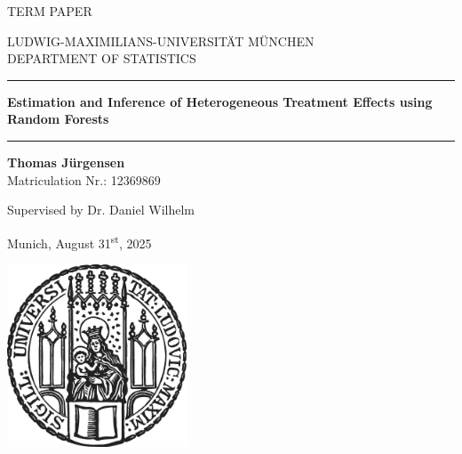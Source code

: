 \begin{titlepage}
\begin{center}

\Large
TERM PAPER

\vspace{0.5cm}
\Large
LUDWIG-MAXIMILIANS-UNIVERSITÄT MÜNCHEN\\
DEPARTMENT OF STATISTICS

\vspace{0.5cm}

\rule{\textwidth}{1.5pt}
\LARGE
\textbf{Estimation and Inference of Heterogeneous Treatment Effects using Random Forests}
\rule{\textwidth}{1.5pt}

\vspace{0.5cm}

\Large
\textbf{Thomas Jürgensen}\\
\large
Matriculation Nr.: 12369869

\vspace{0.5cm}

Supervised by Dr. Daniel Wilhelm

\vspace{0.5cm}

\large
Munich, August 31\textsuperscript{st}, 2025
      
\vspace{0.5cm}

\includegraphics[width = 0.4\textwidth]{sigillum.png}

\vspace{0.5cm}

\vfill

\end{center}
\end{titlepage}
\newpage
\newpage

